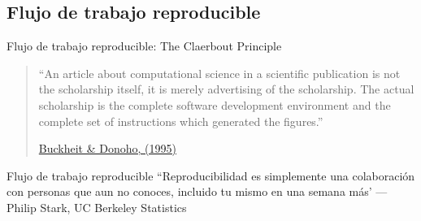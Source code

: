 \documentclass{beamer}
\begin{document}
 { %
    \begin{frame}[plain, label=AEAreg]
     \end{frame}
}	

 \subsection*{Flujo de trabajo reproducible}
 

\begin{frame}{Flujo de trabajo reproducible: The Claerbout Principle}

\begin{quote}``An article about computational science in a scientific publication is not the scholarship itself, it is merely advertising of the scholarship. The actual scholarship is the complete software development environment and the complete set of instructions which generated the figures.'' 

\href{https://statweb.stanford.edu/~wavelab/Wavelab_850/wavelab.pdf}{Buckheit \& Donoho, (1995)}\end{quote}
\end{frame}
 
 
 \begin{frame}{Flujo de trabajo reproducible}
``Reproducibilidad es simplemente una colaboración con personas que aun no conoces, incluido tu mismo en una semana más'
---Philip Stark, UC Berkeley Statistics
\end{frame}
\end{document}
